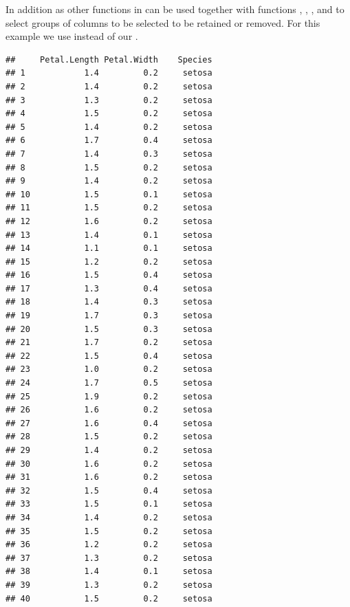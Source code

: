 \documentclass[krantz2]{krantz}\usepackage{knitr}%
\begin{document}
In addition  as other functions in  can be used together with functions , , , and  to select groups of columns to be selected to be retained or removed. For this example we use \Rlang {} instead of our .

\begin{knitrout}\footnotesize
{}\color{fgcolor}\begin{kframe}
\begin{alltt}
 \hlopt{-}\hlstd{(}\hlstd{))}
\end{alltt}
\begin{verbatim}
##     Petal.Length Petal.Width    Species
## 1            1.4         0.2     setosa
## 2            1.4         0.2     setosa
## 3            1.3         0.2     setosa
## 4            1.5         0.2     setosa
## 5            1.4         0.2     setosa
## 6            1.7         0.4     setosa
## 7            1.4         0.3     setosa
## 8            1.5         0.2     setosa
## 9            1.4         0.2     setosa
## 10           1.5         0.1     setosa
## 11           1.5         0.2     setosa
## 12           1.6         0.2     setosa
## 13           1.4         0.1     setosa
## 14           1.1         0.1     setosa
## 15           1.2         0.2     setosa
## 16           1.5         0.4     setosa
## 17           1.3         0.4     setosa
## 18           1.4         0.3     setosa
## 19           1.7         0.3     setosa
## 20           1.5         0.3     setosa
## 21           1.7         0.2     setosa
## 22           1.5         0.4     setosa
## 23           1.0         0.2     setosa
## 24           1.7         0.5     setosa
## 25           1.9         0.2     setosa
## 26           1.6         0.2     setosa
## 27           1.6         0.4     setosa
## 28           1.5         0.2     setosa
## 29           1.4         0.2     setosa
## 30           1.6         0.2     setosa
## 31           1.6         0.2     setosa
## 32           1.5         0.4     setosa
## 33           1.5         0.1     setosa
## 34           1.4         0.2     setosa
## 35           1.5         0.2     setosa
## 36           1.2         0.2     setosa
## 37           1.3         0.2     setosa
## 38           1.4         0.1     setosa
## 39           1.3         0.2     setosa
## 40           1.5         0.2     setosa

\end{verbatim}
\end{kframe}
\end{knitrout}
\end{document}
